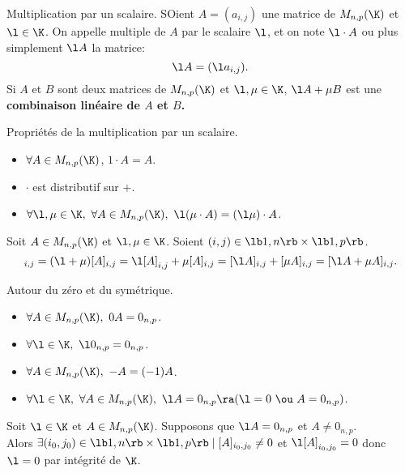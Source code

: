 \documentclass[11pt]{article}
\begin{document}
\begin{defi}{Multiplication par un scalaire.}{}
    SOient $A=(a_{i,j})$ une matrice de $M_{n,p}(\K)$ et $\l\in\K$. On appelle multiple de $A$ par le scalaire $\l$, et on note $\l\cdot A$ ou plus simplement $\l A$ la matrice:
    \begin{equation*}
        \l A = (\l a_{i,j}).
    \end{equation*}
    Si $A$ et $B$ sont deux matrices de $M_{n,p}(\K)$ et $\l,\mu\in\K$, $\l A+\mu B$ est une \bf{combinaison linéaire} de $A$ et $B$.
\end{defi}

\begin{prop}{Propriétés de la multiplication par un scalaire.}{}
    \begin{itemize}
        \item $\forall A \in M_{n,p}(\K)$, $1\cdot A=A$.
        \item $\cdot$ est distributif sur $+$.
        \item $\forall \l, \mu \in \K, ~ \forall A \in M_{n,p}(\K), ~ \l(\mu\cdot A)=(\l\mu)\cdot A$.
    \end{itemize}
    \tcblower
    Soit $A\in M_{n,p}(\K)$ et $\l,\mu\in\K$. Soient $(i,j)\in\lb1,n\rb\times\lb1,p\rb$.
    \begin{equation*}
        [(\l+\mu)A]_{i,j}=(\l+\mu)[A]_{i,j}=\l[A]_{i,j}+\mu[A]_{i,j}=[\l A]_{i,j}+[\mu A]_{i,j}=[\l A + \mu A]_{i,j}.
    \end{equation*}
\end{prop}

\begin{prop}{Autour du zéro et du symétrique.}{}
    \begin{itemize}
        \item $\forall A \in M_{n,p}(\K), ~ 0A=0_{n,p}$.
        \item $\forall \l \in \K, ~ \l0_{n,p}=0_{n,p}$.
        \item $\forall A \in M_{n,p}(\K), ~ -A=(-1)A$.
        \item $\forall \l \in \K, ~ \forall A \in M_{n,p}(\K), ~ \l A = 0_{n,p} \ra (\l = 0 ~\ou~ A=0_{n,p})$.
    \end{itemize}
    \tcblower
    Soit $\l\in\K$ et $A\in M_{n,p}(\K)$. Supposons que $\l A=0_{n,p}$ et $A\neq 0_{n,p}$.\\
    Alors $\exists (i_0,j_0)\in\lb1,n\rb\times\lb1,p\rb\mid[A]_{i_0,j_0}\neq0$ et $\l [A]_{i_0,j_0}=0$ donc $\l=0$ par intégrité de $\K$.
\end{prop}
\end{document}
